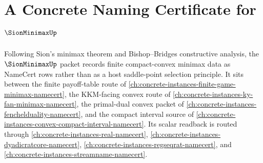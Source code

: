 \chapter{A Concrete Naming Certificate for $\SionMinimaxUp$}
\label{ch:concrete-instances-sion-minimax-namecert}

Following Sion's minimax theorem and Bishop--Bridges constructive analysis,
the $\SionMinimaxUp$ packet records finite compact-convex minimax data as
NameCert rows rather than as a host saddle-point selection principle. It sits
between the finite payoff-table route of
\autoref{ch:concrete-instances-finite-game-minimax-namecert}, the KKM-facing
convex route of \autoref{ch:concrete-instances-ky-fan-minimax-namecert}, the
primal-dual convex packet of
\autoref{ch:concrete-instances-fenchelduality-namecert}, and the compact
interval source of
\autoref{ch:concrete-instances-convex-compact-interval-namecert}. Its scalar
readback is routed through \autoref{ch:concrete-instances-real-namecert},
\autoref{ch:concrete-instances-dyadicratcore-namecert},
\autoref{ch:concrete-instances-regseqrat-namecert}, and
\autoref{ch:concrete-instances-streamname-namecert}.

